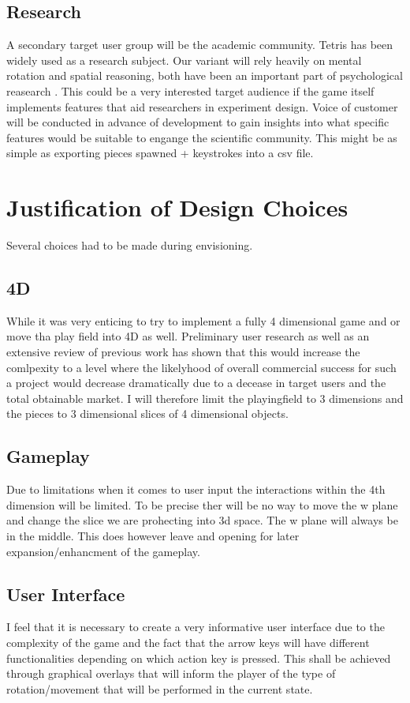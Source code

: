 \documentclass{article}
\begin{document}
\subsection{Research}
A secondary target user group will be the academic community. Tetris has been widely used as a research subject. Our variant will rely heavily on mental rotation and spatial reasoning, both have been an important part of psychological reasearch \cite{COOPER197520} \cite{CORBALLIS1997100} \cite{Kornhaber_2020} \cite{Lau_zhu}. This could be a very interested target audience if the game itself implements features that aid researchers in experiment design. Voice of customer will be conducted in advance of development to gain insights into what specific features would be suitable to engange the scientific community.
This might be as simple as exporting pieces spawned + keystrokes into a csv file.

\section{Justification of Design Choices}
Several choices had to be made during envisioning.
\subsection{4D}
While it was very enticing to try to implement a fully 4 dimensional game and or move tha play field into 4D as well. Preliminary user research as well as an extensive review of previous work has shown that this would increase the comlpexity to a level where the likelyhood of overall commercial success for such a project would decrease dramatically due to a decease in target users and the total obtainable market. I will therefore limit the playingfield to 3 dimensions and the pieces to 3 dimensional slices of 4 dimensional objects.
\subsection{Gameplay}
Due to limitations when it comes to user input the interactions within the 4th dimension will be limited. To be precise ther will be no way to move the w plane and change the slice we are prohecting into 3d space. The w plane will always be in the middle. This does however leave and opening for later expansion/enhancment of the gameplay.
\subsection{User Interface}
I feel that it is necessary to create a very informative user interface due to the complexity of the game and the fact that the arrow keys will have different functionalities depending on which action key is pressed. This shall be achieved through graphical overlays that will inform the player of the type of rotation/movement that will be performed in the current state.
\end{document}
